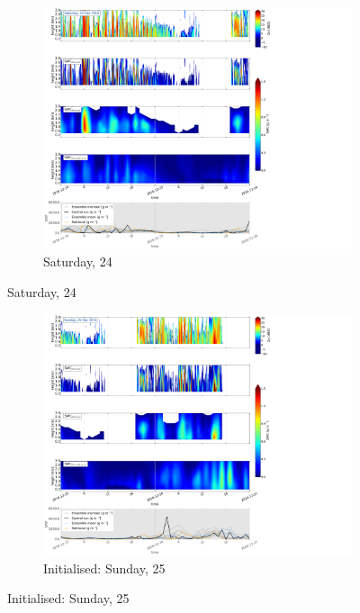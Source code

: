\begin{figure}[t]\ContinuedFloat
	\centering
	\begin{subfigure}[t]{0.8\textwidth}
		\includegraphics[trim={2.3cm 17.6cm 27.cm 0.5cm},clip,width=\textwidth]{./fig_SWC/20161224}
		\caption{Saturday, \SI{24}{\dec}}\label{fig:SWC24}
	\end{subfigure}
\end{figure}
\begin{figure}[t]\ContinuedFloat        
	\centering
	\begin{subfigure}[t]{0.8\textwidth}
		\includegraphics[trim={2.3cm 17.6cm 27.cm 0.5cm},clip,width=\textwidth]{./fig_SWC/20161225}
		\caption{Initialised: Sunday, \SI{25}{\dec}}\label{fig:SWC25}
	\end{subfigure}
\end{figure}
